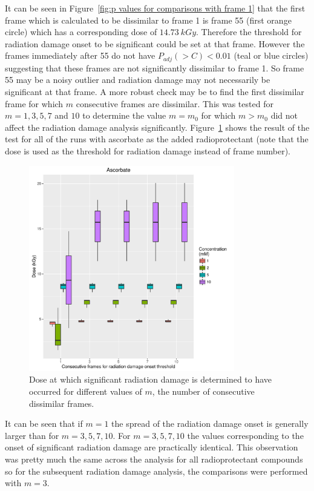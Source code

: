 It can be seen in Figure~\ref{fig:p values for comparisons with frame 1} that the first frame which is calculated to be dissimilar to frame 1 is frame 55 (first orange circle) which has a corresponding dose of $14.73\ kGy$.
Therefore the threshold for radiation damage onset to be significant could be set at that frame.
However the frames immediately after 55 do not have $P_{adj}(>C) < 0.01$ (teal or blue circles) suggesting that these frames are not significantly dissimilar to frame 1.
So frame 55 may be a noisy outlier and radiation damage may not necessarily be significant at that frame.
A more robust check may be to find the first dissimilar frame for which $m$ consecutive frames are dissimilar.
This was tested for $m = 1, 3, 5, 7$ and $10$ to determine the value $m = m_0$ for which $m > m_0$ did not affect the radiation damage analysis significantly.
Figure~\ref{fig:Num consecutive frame test} shows the result of the test for all of the runs with ascorbate as the added radioprotectant (note that the dose is used as the threshold for radiation damage instead of frame number).
\begin{figure}
    \centering
    \includegraphics[width=0.8\textwidth]{figures/saxs/Ascorbate_Num_consec_fr_comp.pdf}
    \caption{Dose at which significant radiation damage is determined to have occurred for different values of $m$, the number of consecutive dissimilar frames.}
    \label{fig:Num consecutive frame test}
\end{figure}
It can be seen that if $m=1$ the spread of the radiation damage onset is generally larger than for $m=3, 5, 7, 10$.
For $m=3, 5, 7, 10$ the values corresponding to the onset of significant radiation damage are practically identical.
This observation was pretty much the same across the analysis for all radioprotectant compounds so for the subsequent radiation damage analysis, the comparisons were performed with $m = 3$.

